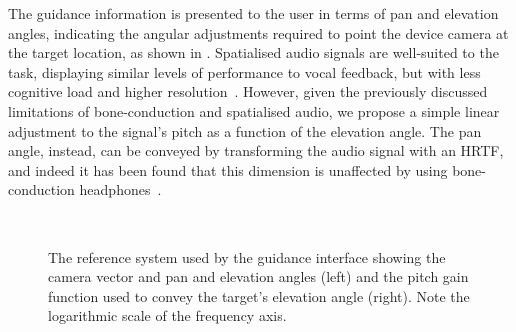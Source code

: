 \documentclass[acmsmall]{acmart}
\begin{document}
The guidance information is presented to the user in terms of pan and elevation angles, indicating the angular adjustments required to point the device camera at the target location, as shown in .
Spatialised audio signals are well-suited to the task, displaying similar levels of performance to vocal feedback, but with less cognitive load and higher resolution~\citep{klatzky2006cognitive}.
However, given the previously discussed limitations of bone-conduction and spatialised audio, we propose a simple linear adjustment to the signal's pitch as a function of the elevation angle. 
The pan angle, instead, can be conveyed by transforming the audio signal with an HRTF, and indeed it has been found that this dimension is unaffected by using bone-conduction headphones~\citep{schonstein2008comparison,macdonald2006spatial,stanley2006lateralization}. 

\begin{figure}
  \centering
~
  \caption{The reference system used by the guidance interface showing the camera vector and pan and elevation angles (left) and the pitch gain function used to convey the target's elevation angle (right). Note the logarithmic scale of the frequency axis. }
\end{figure}
\end{document}
